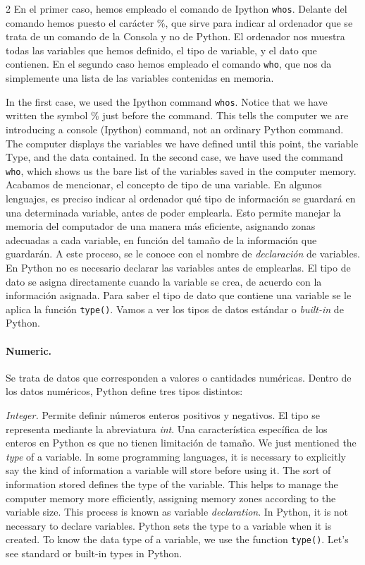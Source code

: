 \begin{paracol}{2}
 En el primer caso, hemos empleado el comando de Ipython \texttt{whos}. Delante del comando hemos puesto el carácter \%, que sirve para indicar al ordenador que se trata de un comando de la Consola y no de Python. El ordenador nos muestra todas las variables que hemos definido, el tipo de variable, y el dato que contienen. En el segundo caso hemos empleado el comando \texttt{who}, que nos da simplemente una lista de las variables contenidas en memoria. 

 \switchcolumn
 In the first case, we used the Ipython command \texttt{whos}. Notice that we have written the symbol \% just before the command. This tells the computer we are introducing a console (Ipython) command, not an ordinary Python command. The computer displays the variables we have defined until this point, the variable Type, and the data contained. In the second case, we have used the command \texttt{who}, which shows us the bare list of the variables saved in the computer memory.
 \switchcolumn Acabamos de mencionar, el concepto de tipo de una variable. En algunos lenguajes, es preciso indicar al ordenador qué tipo de información se guardará en una determinada variable, antes de poder emplearla. Esto permite manejar la memoria del computador de una manera más eficiente, asignando zonas adecuadas a cada variable, en función del tamaño de la información que guardarán. A este proceso, se le conoce con el nombre de \emph{declaración} de variables. En Python no es necesario declarar las variables antes de emplearlas. El tipo de dato se asigna directamente cuando la variable se crea, de acuerdo con la información asignada. Para saber el tipo de dato que contiene una variable se le aplica la función \texttt{type()}. Vamos a ver los tipos de datos estándar o \emph{built-in} de Python.

\paragraph{Numeric.} Se trata de datos que corresponden a valores o cantidades numéricas. Dentro de los datos numéricos, Python define tres tipos distintos:

\emph{Integer.} Permite definir números enteros positivos y negativos. El tipo se representa mediante la abreviatura \emph{int}. Una característica específica de los enteros en Python es que no tienen limitación de tamaño.
\switchcolumn
We just mentioned the \emph{type} of a variable. In some programming languages, it is necessary to explicitly say the kind of information a variable will store before using it. The sort of information stored defines the type of the variable. This helps to manage the computer memory more efficiently, assigning memory zones according to the variable size. This process is known as variable \emph{declaration}. In Python, it is not necessary to declare variables. Python sets the type to a variable when it is created. To know the data type of a variable, we use the function \texttt{type()}. Let's see standard or built-in types in Python.


\end{paracol}
